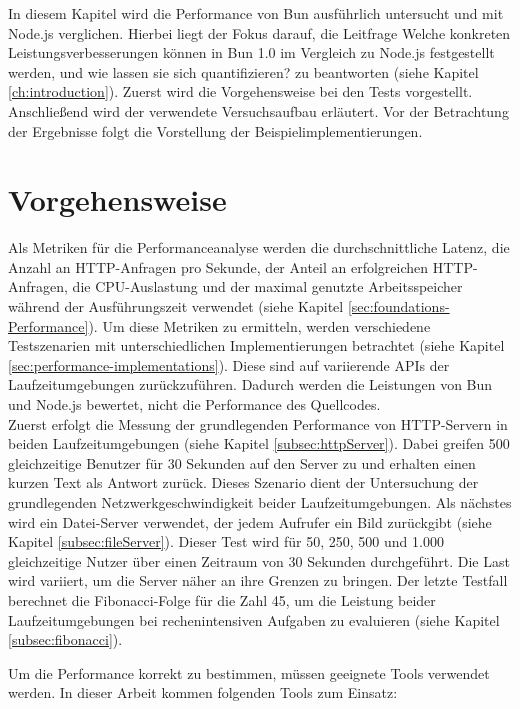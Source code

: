  \label{ch:performanceAnalysis}
In diesem Kapitel wird die Performance von Bun ausführlich untersucht und mit Node.js verglichen. Hierbei liegt der Fokus darauf, die Leitfrage \glqq Welche konkreten Leistungsverbesserungen können in Bun 1.0 im Vergleich zu Node.js festgestellt werden, und wie lassen sie sich quantifizieren?\grqq{} zu beantworten (siehe Kapitel \ref{ch:introduction}). Zuerst wird die Vorgehensweise bei den Tests vorgestellt. Anschließend wird der verwendete Versuchsaufbau erläutert. Vor der Betrachtung der Ergebnisse folgt die Vorstellung der Beispielimplementierungen.


\section{Vorgehensweise} \label{sec:performance-approach}
Als Metriken für die Performanceanalyse werden die durchschnittliche Latenz, die Anzahl an HTTP-Anfragen pro Sekunde, der Anteil an erfolgreichen HTTP-Anfragen, die CPU-Auslastung und der maximal genutzte Arbeitsspeicher während der Ausführungszeit verwendet (siehe Kapitel \ref{sec:foundations-Performance}). Um diese Metriken zu ermitteln, werden verschiedene Testszenarien mit unterschiedlichen Implementierungen betrachtet (siehe Kapitel \ref{sec:performance-implementations}). Diese sind auf variierende APIs der Laufzeitumgebungen zurückzuführen. Dadurch werden die Leistungen von Bun und Node.js bewertet, nicht die Performance des Quellcodes.\\

\noindent
Zuerst erfolgt die Messung der grundlegenden Performance von HTTP-Servern in beiden Laufzeitumgebungen (siehe Kapitel \ref{subsec:httpServer}). Dabei greifen 500 gleichzeitige Benutzer für 30 Sekunden auf den Server zu und erhalten einen kurzen Text als Antwort zurück. Dieses Szenario dient der Untersuchung der grundlegenden Netzwerkgeschwindigkeit beider Laufzeitumgebungen. Als nächstes wird ein Datei-Server verwendet, der jedem Aufrufer ein Bild zurückgibt (siehe Kapitel \ref{subsec:fileServer}). Dieser Test wird für 50, 250, 500 und 1.000 gleichzeitige Nutzer über einen Zeitraum von 30 Sekunden durchgeführt. Die Last wird variiert, um die Server näher an ihre Grenzen zu bringen. Der letzte Testfall berechnet die Fibonacci-Folge für die Zahl 45, um die Leistung beider Laufzeitumgebungen bei rechenintensiven Aufgaben zu evaluieren (siehe Kapitel \ref{subsec:fibonacci}).

\noindent
Um die Performance korrekt zu bestimmen, müssen geeignete Tools verwendet werden. In dieser Arbeit kommen folgenden Tools zum Einsatz:

